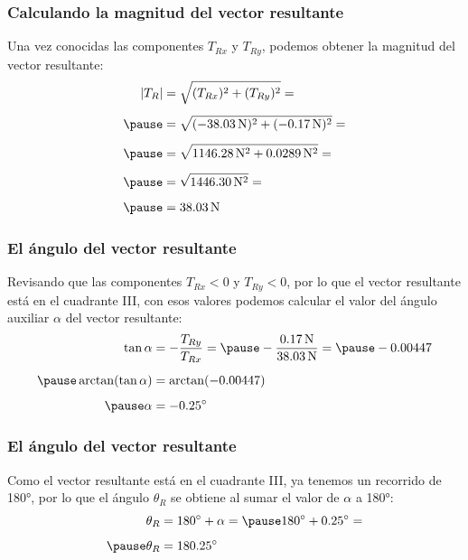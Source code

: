 \documentclass[12pt]{beamer}
\begin{document}
\begin{frame}
\frametitle{Calculando la magnitud del vector resultante}
Una vez conocidas las componentes $T_{Rx}$ y $T_{Ry}$, podemos obtener la magnitud del vector resultante:
\pause
\begin{eqnarray*}
\begin{aligned}
\abs{T_{R}} &= \sqrt{(T_{Rx})^{2} + (T_{Ry})^{2}} = \\[0.5em] \pause
&= \sqrt{ (- \SI{38.03}{\newton})^{2} + (-\SI{0.17}{\newton})^{2}} = \\[0.5em] \pause
&= \sqrt{ \SI{1146.28}{\square\newton} + \SI{0.0289}{\square\newton}} = \\[0.5em] \pause
&= \sqrt{\SI{1446.30}{\square\newton}} = \\[0.5em] \pause
&= \SI{38.03}{\newton}
\end{aligned}
\end{eqnarray*}
\end{frame}
\begin{frame}
\frametitle{El ángulo del vector resultante}
Revisando que las componentes $T_{Rx} < 0$ y $T_{Ry} < 0$, por lo que el vector resultante está en el cuadrante III, \pause con esos valores podemos calcular el valor del ángulo auxiliar $\alpha$ del vector resultante:
\pause
\begin{eqnarray*}
\begin{aligned}
\tan \alpha &= - \dfrac{T_{Ry}}{T_{Rx}} = \pause
 - \dfrac{\SI{0.17}{\newton}}{\SI{38.03}{\newton}} = \pause - 0.00447 \\[0.5em] \pause
\arctan(\tan \alpha) &= \arctan(- 0.00447) \\[0.5em] \pause
\alpha &= - \ang{0.25}
\end{aligned}
\end{eqnarray*}
\end{frame}
\begin{frame}
\frametitle{El ángulo del vector resultante}
Como el vector resultante está en el cuadrante III, ya tenemos un recorrido de \ang{180}, por lo que el ángulo $\theta_{R}$ se obtiene al sumar el valor de $\alpha$ a \ang{180}:
\pause
\begin{eqnarray*}
\begin{aligned}
\theta_{R} &= \ang{180} + \alpha = \pause \ang{180} + \ang{0.25} = \\[0.5em] \pause
\theta_{R} &= \ang{180.25}
\end{aligned}
\end{eqnarray*}
\end{frame}
\end{document}
